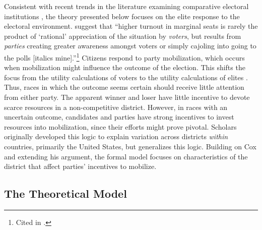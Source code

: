 \documentclass[12pt]{article}
\begin{document}
Consistent with recent trends in the literature examining comparative electoral institutions \citep{Cox1999, Selb2009}, the theory presented below focuses on the elite response to the electoral environment. \cite{DenverHands1974} suggest that ``higher turnout in marginal seats is rarely the product of `rational' appreciation of the situation by \textit{voters}, but results from \textit{parties} creating greater awareness amongst voters or simply cajoling into going to the polls [italics mine].''\footnote{Cited in \cite{Cox1999}.} Citizens respond to party mobilization, which occurs when mobilization might influence the outcome of the election. This shifts the focus from the utility calculations of voters to the utility calculations of elites \citep{CoxMunger1989, Cox1999}. Thus, races in which the outcome seems certain should receive little attention from either party. The apparent winner and loser have little incentive to devote scarce resources in a non-competitive district. However, in races with an uncertain outcome, candidates and parties have strong incentives to invest resources into mobilization, since their efforts might prove pivotal. Scholars originally developed this logic to explain variation across districts \textit{within} countries, primarily the United States, but \cite{Cox1999} generalizes this logic. Building on Cox and extending his argument, the formal model focuses on characteristics of the district that affect parties' incentives to mobilize.

\subsection*{The Theoretical Model}
\end{document}
